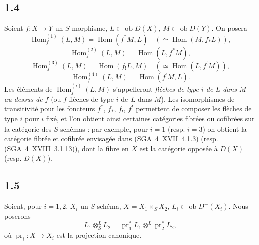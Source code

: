 \documentclass[11pt]{article}
\DeclareMathOperator{\Hom}{Hom}
\newcommand{\ob}{\operatorname{ob}}
\providecommand{\pr}{\operatorname{pr}}
\providecommand{\Hom}{\operatorname{Hom}}
\providecommand{\ob}{\operatorname{ob}}
\begin{document}
\subsection*{1.4}
Soient $f:X\to Y$ un $S$-morphisme, $L\in\ob D(X)$, $M\in\ob D(Y)$. On posera
\[
\Hom_f^{(1)}(L,M)=\Hom(f^{*}M,L)\quad (\simeq \Hom(M,f_{*}L)),
\]
\[
\Hom_f^{(2)}(L,M)=\Hom(L,f^{*}M),
\]
\[
\Hom_f^{(3)}(L,M)=\Hom(f_{!}L,M)\quad (\simeq \Hom(L,f^{!}M)),
\]
\[
\Hom_f^{(4)}(L,M)=\Hom(f^{!}M,L).
\]
Les éléments de $\Hom_f^{(i)}(L,M)$ s'appelleront \emph{flèches de type $i$ de $L$ dans $M$ au-dessus de $f$} (ou $f$-flèches de type $i$ de $L$ dans $M$). Les isomorphismes de transitivité pour les foncteurs $f^{*}$, $f_{*}$, $f_{!}$, $f^{!}$ permettent de composer les flèches de type $i$ pour $i$ fixé, et l'on obtient ainsi certaines catégories fibrées ou cofibrées sur la catégorie des $S$-schémas : par exemple, pour $i=1$ (resp. $i=3$) on obtient la catégorie fibrée et cofibrée envisagée dans (SGA~4~XVII~4.1.3) (resp. (SGA~4~XVIII~3.1.13)), dont la fibre en $X$ est la catégorie opposée à $D(X)$ (resp. $D(X)$).

\subsection*{1.5}
Soient, pour $i=1,2$, $X_i$ un $S$-schéma, $X=X_1\times_S X_2$, $L_i\in\ob D^{-}(X_i)$. Nous poserons
\[
L_1\otimes^{L}_{S}L_2=\pr_1^{*}L_1\otimes^{L}\pr_2^{*}L_2,
\]
où $\pr_i:X\to X_i$ est la projection canonique.
\end{document}
